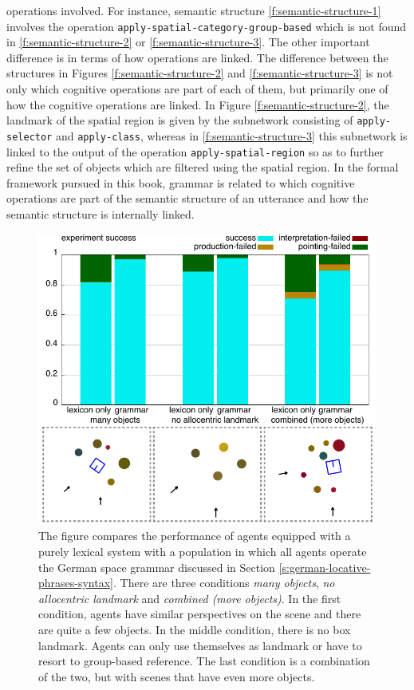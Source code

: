 operations involved. For instance, semantic structure \ref{f:semantic-structure-1}
involves the operation {\footnotesize\tt apply-spatial-category-group-based} 
which is not found in
\ref{f:semantic-structure-2} or \ref{f:semantic-structure-3}. The other 
important difference is in terms of how operations are linked. The 
difference between the structures in Figures \ref{f:semantic-structure-2}
and \ref{f:semantic-structure-3} is not only which cognitive operations 
are part of each of them, but primarily one of how the cognitive 
operations are linked. In Figure \ref{f:semantic-structure-2},
the landmark of the spatial region is given by the subnetwork consisting 
of {\footnotesize\tt apply-selector} and {\footnotesize\tt apply-class}, whereas in 
\ref{f:semantic-structure-3} this subnetwork is linked to the output of
the operation {\footnotesize\tt apply-spatial-region} so as to further refine the 
set of objects which are filtered using the spatial region. In the formal 
framework pursued in this book, grammar is related to which cognitive 
operations are part of the semantic structure of an 
utterance and how the semantic structure is internally linked.

\begin{figure}
\includegraphics[width=1.0\columnwidth]{figs/why-grammar-german}
\caption[German locative phrases with and without grammar]{
The figure compares
the performance of agents equipped with a purely 
lexical system with a population in 
which all agents operate the German space 
grammar discussed in Section 
\ref{s:german-locative-phrases-syntax}.
There are three conditions \emph{many objects}, 
\emph{no allocentric landmark} and 
\emph{combined (more objects)}. In the first 
condition, agents have similar perspectives on the scene 
and there are quite a few objects. In the middle condition, there 
is no box landmark. Agents can only use 
themselves as landmark or have to resort to group-based 
reference. The last condition is a combination
of the two, but with scenes that have even more objects.}
\label{f:why-grammar-german}
\end{figure}



